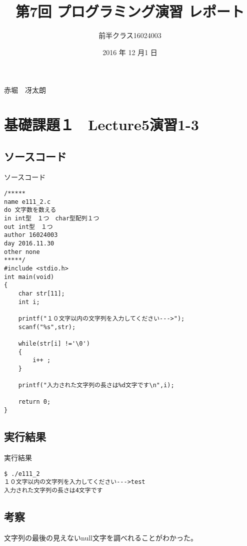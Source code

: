 \documentclass[a4j,titlepage]{jarticle}
\begin{document}

\title{第7回 プログラミング演習 レポート}

\author{前半クラス16024003}{赤堀　冴太朗}

\date{2016 年 12 月1 日}
\maketitle


\section{基礎課題１　Lecture5演習1-3}
\subsection{ソースコード}
\begin{itembox}[l]{ソースコード}
\begin{verbatim}
/*****
name e111_2.c
do 文字数を数える
in int型　１つ　char型配列１つ
out int型　１つ
author 16024003
day 2016.11.30
other none
*****/
#include <stdio.h>
int main(void)
{
    char str[11];
    int i;

    printf("１０文字以内の文字列を入力してください--->");
    scanf("%s",str);

    while(str[i] !='\0')
    {
        i++ ;
    }

    printf("入力された文字列の長さは%d文字です\n",i);

    return 0;
}
\end{verbatim}
\end{itembox}

\subsection{実行結果}
\begin{itembox}[l]{実行結果}
\begin{verbatim}
$ ./e111_2
１０文字以内の文字列を入力してください--->test
入力された文字列の長さは4文字です
\end{verbatim}
\end{itembox}

\subsection{考察}
文字列の最後の見えないnull文字を調べれることがわかった。
\end{document}
